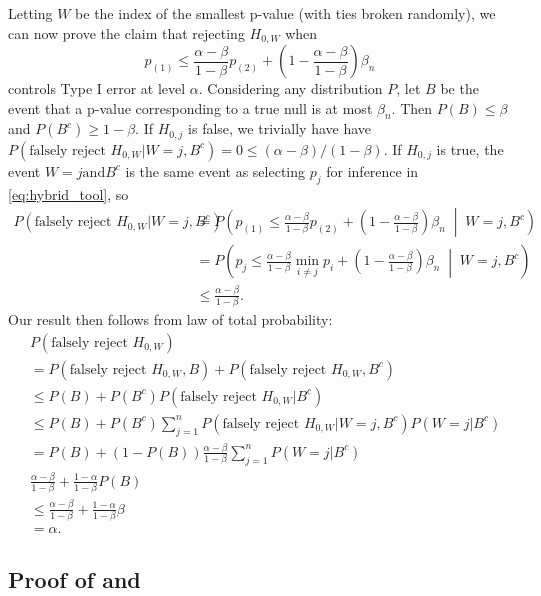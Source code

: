 \documentclass{article}
\begin{document}
\begin{appendix}
Letting $W$ be the index of the smallest p-value (with ties broken randomly), we can now prove the claim that rejecting $H_{0, W}$ when 
\begin{equation*}
    p_{(1)} \leq \frac{\alpha-\beta}{1-\beta} p_{(2)} + \left(1 - \frac{\alpha-\beta}{1-\beta} \right) \beta_n 
\end{equation*}
controls Type I error at level $\alpha$. Considering any distribution $P$, let $B$ be the event that a p-value corresponding to a true null is at most $\beta_n$.  Then $P(B) \leq \beta$ and $P(B^c) \geq 1-\beta$. If $H_{0, j}$ is false, we trivially have have $P(\text{falsely reject } H_{0, W} | W = j, B^c) = 0 \leq (\alpha-\beta)/(1-\beta)$. If $H_{0, j}$ is true, the event $W=j \text{and} B^c$ is the same event as selecting $p_j$ for inference in \eqref{eq:hybrid_tool}, so 
\begin{align*}
    P(\text{falsely reject } H_{0, W} | W = j, B^c) &= P\left(p_{(1)} \leq \frac{\alpha-\beta}{1-\beta} p_{(2)} + \left(1 - \frac{\alpha-\beta}{1-\beta} \right) \beta_n  \;\middle|\; W = j, B^c\right)\\
    &=  P\left(p_j \leq \frac{\alpha-\beta}{1-\beta} \min_{i \neq j}p_i + \left(1 - \frac{\alpha-\beta}{1-\beta} \right) \beta_n  \;\middle|\; W = j, B^c\right)\\
    &\leq \frac{\alpha - \beta}{1-\beta}.
\end{align*}
Our result then follows from law of total probability:
\begin{align*}
    &P(\text{falsely reject } H_{0, W} )\\
    &=P(\text{falsely reject } H_{0, W}, B ) + P(\text{falsely reject } H_{0, W}, B^c )\\
    &\leq P(B)  + P(B^c) P(\text{falsely reject } H_{0, W}| B^c )\\
    &\leq P(B)  + P(B^c)  \sum_{j=1}^n P(\text{falsely reject } H_{0, W}|W =j, B^c ) P(W=j | B^c)\\
    &= P(B)  + (1 - P(B)) \frac{\alpha-\beta}{1-\beta}  \sum_{j=1}^n  P(W=j | B^c)\\
    &\frac{\alpha -\beta}{1-\beta} + \frac{1-\alpha}{1-\beta} P(B)\\
    &\leq \frac{\alpha -\beta}{1-\beta} + \frac{1-\alpha}{1-\beta} \beta\\
    &= \alpha. 
\end{align*}

\subsection{Proof of  and  }


\end{appendix}
\end{document}
